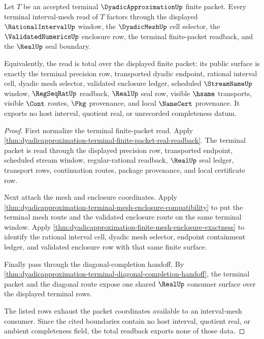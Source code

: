 \begin{theorem}
\label{thm:dyadicapproximation-terminal-interval-mesh-readback-totality}
Let $T$ be an accepted terminal $\DyadicApproximationUp$ finite packet. Every
terminal interval-mesh read of $T$ factors through the displayed
$\RationalIntervalUp$ window, the $\DyadicMeshUp$ cell selector, the
$\ValidatedNumericsUp$ enclosure row, the terminal finite-packet readback, and
the $\RealUp$ seal boundary.

Equivalently, the read is total over the displayed finite packet: its public
surface is exactly the terminal precision row, transported dyadic endpoint,
rational interval cell, dyadic mesh selector, validated enclosure ledger,
scheduled $\StreamNameUp$ window, $\RegSeqRatUp$ readback, $\RealUp$ seal row,
visible $\hsame$ transports, visible $\Cont$ routes, $\Pkg$ provenance, and
local $\NameCert$ provenance. It exports no host interval, quotient real, or
unrecorded completeness datum.
\end{theorem}
\begin{proof}
First normalize the terminal finite-packet read. Apply
\autoref{thm:dyadicapproximation-terminal-finite-packet-real-readback}. The
terminal packet is read through the displayed precision row, transported
endpoint, scheduled stream window, regular-rational readback, $\RealUp$ seal
ledger, transport rows, continuation routes, package provenance, and local
certificate row.

Next attach the mesh and enclosure coordinates. Apply
\autoref{thm:dyadicapproximation-terminal-mesh-enclosure-compatibility} to put
the terminal mesh route and the validated enclosure route on the same terminal
window. Apply \autoref{thm:dyadicapproximation-finite-mesh-enclosure-exactness}
to identify the rational interval cell, dyadic mesh selector, endpoint
containment ledger, and validated enclosure row with that same finite surface.

Finally pass through the diagonal-completion handoff. By
\autoref{thm:dyadicapproximation-terminal-diagonal-completion-handoff}, the
terminal packet and the diagonal route expose one shared $\RealUp$ consumer
surface over the displayed terminal rows.

The listed rows exhaust the packet coordinates available to an interval-mesh
consumer. Since the cited boundaries contain no host interval, quotient real,
or ambient completeness field, the total readback exports none of those data.
\end{proof}
